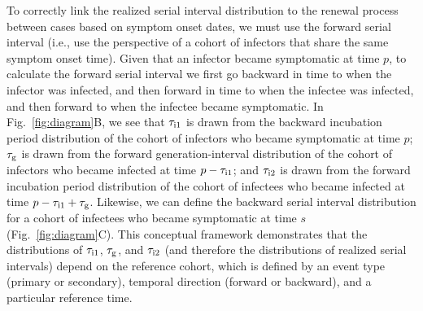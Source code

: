 \documentclass[12pt]{article}
\newcommand{\fref}[1]{Fig.~\ref{fig:#1}}
\newcommand{\psymp}{\ensuremath{p}} %
\newcommand{\ssymp}{\ensuremath{s}} %
\newcommand{\gtime}{\tau_{\rm g}} %
\begin{document}
To correctly link the realized serial interval distribution to the renewal process
between cases based on symptom onset dates, we must use the forward
serial interval (i.e., use the perspective of a cohort of infectors
that share the same symptom onset time).  Given that an infector
became symptomatic at time $\psymp$, to calculate the forward serial
interval we first go backward in time to when the infector was
infected, and then forward in time to when the infectee was infected,
and then forward to when the infectee became symptomatic.
In \fref{diagram}B, we see that $\tau_{\rm i1}$ is drawn from
the backward incubation period distribution of the cohort
of infectors who became symptomatic at time $\psymp$; $\gtime$ is drawn from
the forward generation-interval distribution of the cohort of
infectors who became infected at time $\psymp - \tau_{\rm i1}$; and $\tau_{\rm i2}$
is drawn from the forward incubation period distribution of the cohort of
infectees who became infected at time $\psymp - \tau_{\rm i1} + \gtime$.
Likewise, we can define the backward serial interval distribution for
a cohort of infectees who became symptomatic at time $\ssymp$
(\fref{diagram}C).  This conceptual framework demonstrates
that the distributions of $\tau_{\rm i1}$, $\gtime$, and $\tau_{\rm i2}$ (and therefore
the distributions of realized serial intervals) depend on the
reference cohort, which is defined by an event type (primary or secondary),
temporal direction (forward or backward), and a particular reference time.
\end{document}

